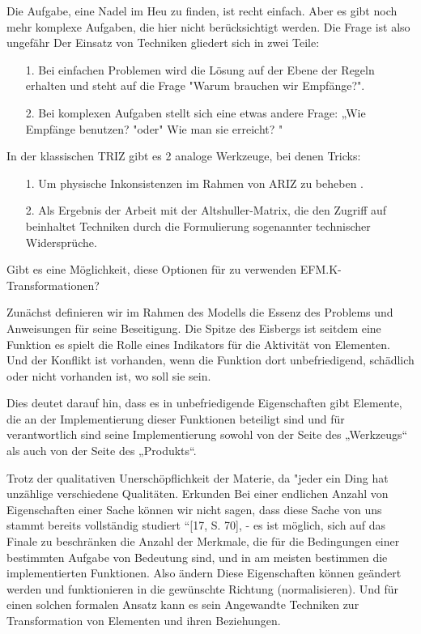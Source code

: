 \documentclass[11pt,a4paper]{article}
\begin{document}
Die Aufgabe, eine Nadel im Heu zu finden, ist recht einfach. Aber es gibt noch
mehr komplexe Aufgaben, die hier nicht berücksichtigt werden. Die Frage ist
also ungefähr Der Einsatz von Techniken gliedert sich in zwei Teile:
\begin{itemize}
\item[1.] Bei einfachen Problemen wird die Lösung auf der Ebene der Regeln
  erhalten und steht auf die Frage "Warum brauchen wir Empfänge?".
\item[2.] Bei komplexen Aufgaben stellt sich eine etwas andere Frage: „Wie
  Empfänge benutzen? "oder" Wie man sie erreicht? "
\end{itemize}
In der klassischen TRIZ gibt es 2 analoge Werkzeuge, bei denen Tricks:
\begin{itemize}
\item[1.] Um physische Inkonsistenzen im Rahmen von ARIZ zu beheben .
\item[2.] Als Ergebnis der Arbeit mit der Altshuller-Matrix, die den Zugriff
  auf beinhaltet Techniken durch die Formulierung sogenannter technischer
  Widersprüche.
\end{itemize}
Gibt es eine Möglichkeit, diese Optionen für zu verwenden
EFM.K-Transformationen?

Zunächst definieren wir im Rahmen des Modells die Essenz des Problems und
Anweisungen für seine Beseitigung. Die Spitze des Eisbergs ist seitdem eine
Funktion es spielt die Rolle eines Indikators für die Aktivität von
Elementen. Und der Konflikt ist vorhanden, wenn die Funktion dort
unbefriedigend, schädlich oder nicht vorhanden ist, wo soll sie sein.

Dies deutet darauf hin, dass es in unbefriedigende Eigenschaften gibt
Elemente, die an der Implementierung dieser Funktionen beteiligt sind und für
verantwortlich sind seine Implementierung sowohl von der Seite des „Werkzeugs“
als auch von der Seite des „Produkts“.

Trotz der qualitativen Unerschöpflichkeit der Materie, da "jeder ein Ding hat
unzählige verschiedene Qualitäten. Erkunden Bei einer endlichen Anzahl von
Eigenschaften einer Sache können wir nicht sagen, dass diese Sache von uns
stammt bereits vollständig studiert “[17, S. 70], - es ist möglich, sich auf
das Finale zu beschränken die Anzahl der Merkmale, die für die Bedingungen
einer bestimmten Aufgabe von Bedeutung sind, und in am meisten bestimmen die
implementierten Funktionen. Also ändern Diese Eigenschaften können geändert
werden und funktionieren in die gewünschte Richtung (normalisieren). Und für
einen solchen formalen Ansatz kann es sein Angewandte Techniken zur
Transformation von Elementen und ihren Beziehungen.
\end{document}
